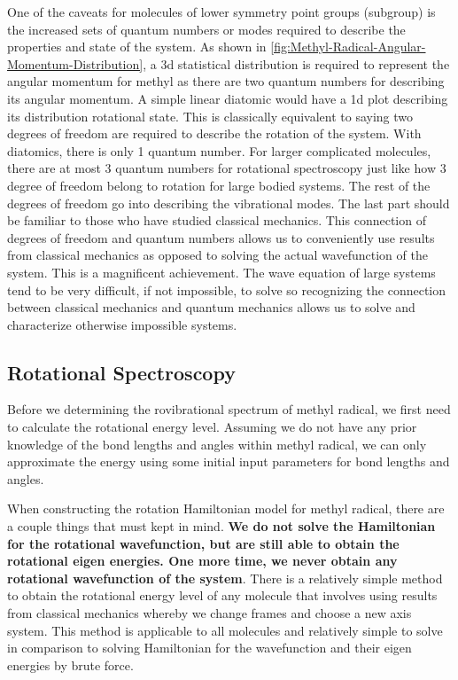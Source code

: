 \documentclass[11pt,a4paper]{book}
\begin{document}
		One of the caveats for molecules of lower symmetry point groups (subgroup) is the increased sets of quantum numbers or modes required to describe the properties and state of the system. As shown in \autoref{fig:Methyl-Radical-Angular-Momentum-Distribution}, a 3d statistical distribution is required to represent the angular momentum for methyl as there are two quantum numbers for describing its angular momentum. A simple linear diatomic would have a 1d plot describing its distribution rotational state. This is classically equivalent to saying two degrees of freedom are required to describe the rotation of the system. With diatomics, there is only 1 quantum number. For larger complicated molecules, there are at most 3 quantum numbers for rotational spectroscopy just like how 3 degree of freedom belong to rotation for large bodied systems. The rest of the degrees of freedom go into describing the vibrational modes. The last part should be familiar to those who have studied classical mechanics. This connection of degrees of freedom and quantum numbers allows us to conveniently use results from classical mechanics as opposed to solving the actual wavefunction of the system. This is a magnificent achievement. The wave equation of large systems tend to be very difficult, if not impossible, to solve so recognizing the connection between classical mechanics and quantum mechanics allows us to solve and characterize otherwise impossible systems.
		\subsection{Rotational Spectroscopy}
			\label{subsec:Rotational Spectroscopy}
			Before we determining the rovibrational spectrum of methyl radical, we first need to calculate the rotational energy level. Assuming we do not have any prior knowledge of the bond lengths and angles within methyl radical, we can only approximate the energy using some initial input parameters for bond lengths and angles. 
			
			When constructing the rotation Hamiltonian model for methyl radical, there are a couple things that must kept in mind. {\bfseries We do not solve the Hamiltonian for the rotational wavefunction, but are still able to obtain the rotational eigen energies. One more time, we never obtain any rotational wavefunction of the system}. There is a relatively simple method to obtain the rotational energy level of any molecule that involves using results from classical mechanics whereby we change frames and choose a new axis system. This method is applicable to all molecules and relatively simple to solve in comparison to solving Hamiltonian for the wavefunction and their eigen energies by brute force.
			
\end{document}
